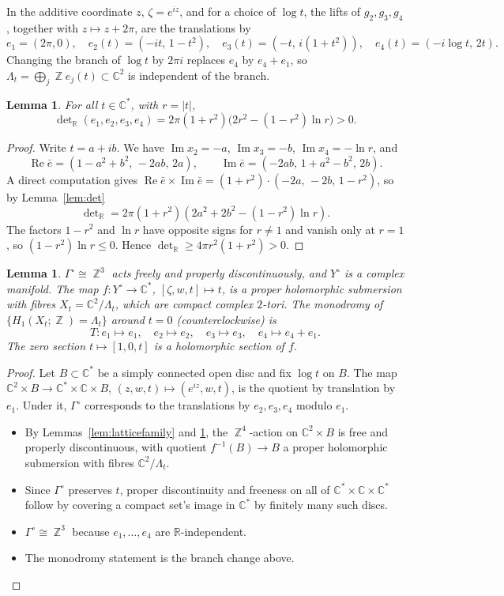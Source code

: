 \documentclass{article}
\DeclareMathOperator{\Z}{\mathbb{Z}}
\newtheorem{lemma}[theorem]{Lemma}
\theoremstyle{definition}
\theoremstyle{plain}
\newcommand{\R}{\mathbb{R}}
\newcommand{\C}{\mathbb{C}}
\newcommand{\eb}{\bar e}
\newcommand{\Yo}{Y^{\circ}}
\DeclareMathOperator{\Ima}{Im}
\DeclareMathOperator{\Rea}{Re}
\begin{document}
In the additive coordinate $z$, $\zeta=e^{iz}$, and for a choice of $\log t$, the
lifts of $g_2,g_3,g_4$, together with $z\mapsto z+2\pi$, are the translations by
\begin{equation}\label{eq:lattice}
e_1=(2\pi,0),\quad e_2(t)=(-it,\,1-t^2),\quad e_3(t)=(-t,\,i(1+t^2)),\quad e_4(t)=(-i\log t,\,2t).
\end{equation}
Changing the branch of $\log t$ by $2\pi i$ replaces $e_4$ by $e_4+e_1$, so
$\Lambda_t=\bigoplus_{j}\Z e_j(t)\subset\C^2$ is independent of the branch.

\begin{lemma}\label{lem:det-family}
For all $t\in\C^*$, with $r=|t|$,
\[
\det\nolimits_\R(e_1,e_2,e_3,e_4)=2\pi(1+r^2)\big(2r^2-(1-r^2)\ln r\big)>0.
\]
\end{lemma}
\begin{proof}
Write $t=a+ib$. We have $\Ima x_2=-a$, $\Ima x_3=-b$, $\Ima x_4=-\ln r$, and
\[
\Rea\eb=(1-a^2+b^2,\,-2ab,\,2a),\qquad \Ima\eb=(-2ab,\,1+a^2-b^2,\,2b).
\]
A direct computation gives
$\Rea\eb\times\Ima\eb=(1+r^2)\cdot(-2a,\,-2b,\,1-r^2)$, so by Lemma~\ref{lem:det}
\[
\det\nolimits_\R=2\pi(1+r^2)(2a^2+2b^2-(1-r^2)\ln r).
\]
The factors $1-r^2$ and $\ln r$ have opposite signs for $r\ne1$ and vanish only at
$r=1$, so $(1-r^2)\ln r\le0$. Hence $\det_\R\ge 4\pi r^2(1+r^2)>0$.
\end{proof}

\begin{lemma}\label{lem:Yo}
$\Gamma^\circ\cong\Z^3$ acts freely and properly discontinuously, and $\Yo$ is a complex
manifold. The map $f\colon\Yo\to\C^*$, $[\zeta,w,t]\mapsto t$, is a proper holomorphic
submersion with fibres $X_t=\C^2/\Lambda_t$, which are compact complex $2$-tori. The
monodromy of $\{H_1(X_t;\Z)=\Lambda_t\}$ around $t=0$ (counterclockwise) is
\[
T\colon e_1\mapsto e_1,\quad e_2\mapsto e_2,\quad e_3\mapsto e_3,\quad e_4\mapsto e_4+e_1.
\]
The zero section $t\mapsto[1,0,t]$ is a holomorphic section of $f$.
\end{lemma}
\begin{proof}
Let $B\subset\C^*$ be a simply connected open disc and fix $\log t$ on $B$. The map
$\C^2\times B\to\C^*\times\C\times B$, $(z,w,t)\mapsto(e^{iz},w,t)$, is the quotient
by translation by $e_1$. Under it, $\Gamma^\circ$ corresponds to the translations by
$e_2,e_3,e_4$ modulo $e_1$.
\begin{itemize}
\item By Lemmas~\ref{lem:latticefamily} and \ref{lem:det-family}, the $\Z^4$-action
  on $\C^2\times B$ is free and properly discontinuous, with quotient
  $f^{-1}(B)\to B$ a proper holomorphic submersion with fibres $\C^2/\Lambda_t$.
\item Since $\Gamma^\circ$ preserves $t$, proper discontinuity and freeness on all of
  $\C^*\times\C\times\C^*$ follow by covering a compact set's image in $\C^*$ by
  finitely many such discs.
\item $\Gamma^\circ\cong\Z^3$ because $e_1,\dots,e_4$ are $\R$-independent.
\item The monodromy statement is the branch change above.
\end{itemize}
\end{proof}
\end{document}
